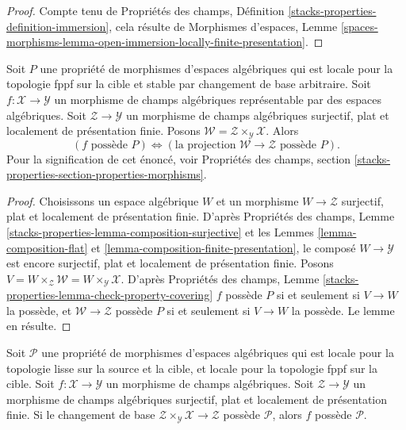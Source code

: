 \begin{proof}
Compte tenu de Propriétés des champs, Définition
\ref{stacks-properties-definition-immersion}, cela résulte de Morphismes
d'espaces, Lemme
\ref{spaces-morphisms-lemma-open-immersion-locally-finite-presentation}.
\end{proof}

\begin{lemma}
\label{lemma-check-property-after-fppf-base-change}
Soit $P$ une propriété de morphismes d'espaces algébriques qui est locale pour
la topologie fppf sur la cible et stable par changement de base arbitraire.
Soit $f : \mathcal{X} \to \mathcal{Y}$ un morphisme de champs algébriques
représentable par des espaces algébriques. Soit
$\mathcal{Z} \to \mathcal{Y}$ un morphisme de champs algébriques surjectif,
plat et localement de présentation finie. Posons
$\mathcal{W} = \mathcal{Z} \times_\mathcal{Y} \mathcal{X}$. Alors
$$
(f\text{ possède }P) \Leftrightarrow
(\text{la projection }\mathcal{W} \to \mathcal{Z}\text{ possède }P).
$$
Pour la signification de cet énoncé, voir Propriétés des champs, section
\ref{stacks-properties-section-properties-morphisms}.
\end{lemma}

\begin{proof}
Choisissons un espace algébrique $W$ et un morphisme
$W \to \mathcal{Z}$ surjectif, plat et localement de présentation finie.
D'après Propriétés des champs, Lemme
\ref{stacks-properties-lemma-composition-surjective}
et les Lemmes \ref{lemma-composition-flat} et
\ref{lemma-composition-finite-presentation}, le composé
$W \to \mathcal{Y}$ est encore surjectif, plat et localement de présentation
finie. Posons
$V = W \times_\mathcal{Z} \mathcal{W} = W \times_\mathcal{Y} \mathcal{X}$.
D'après Propriétés des champs, Lemme
\ref{stacks-properties-lemma-check-property-covering}
$f$ possède $P$ si et seulement si $V \to W$ la possède, et
$\mathcal{W} \to \mathcal{Z}$ possède $P$ si et seulement si $V \to W$
la possède. Le lemme en résulte.
\end{proof}

\begin{lemma}
\label{lemma-descent-property}
Soit $\mathcal{P}$ une propriété de morphismes d'espaces algébriques qui est
locale pour la topologie lisse sur la source et la cible, et locale pour la
topologie fppf sur la cible. Soit
$f : \mathcal{X} \to \mathcal{Y}$ un morphisme de champs algébriques. Soit
$\mathcal{Z} \to \mathcal{Y}$ un morphisme de champs algébriques surjectif,
plat et localement de présentation finie. Si le changement de base
$\mathcal{Z} \times_\mathcal{Y} \mathcal{X} \to \mathcal{Z}$
possède $\mathcal{P}$, alors $f$ possède $\mathcal{P}$.
\end{lemma}

